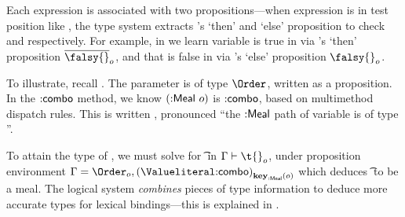 Each expression is associated with two propositions---when expression
 is in test position like
,
the type system extracts 's `then' and `else' proposition to check
 and  respectively.
For example, in 
we learn variable {} is true in  via {}'s `then' proposition $\notprop{\falsy{}}{\makelocal{o}}$, and 
that {} is false in  via {}'s `else' proposition $\isprop{\falsy{}}{\makelocal{o}}$.

To illustrate, recall .
The parameter  is of type $\Order$,
written
{}
as a proposition.
%
In the ${{\mathsf{\mathbin{:}combo}}}$ method, we know
${({\mathsf{\mathbin{:}Meal}}\ o)}$ is ${{\mathsf{\mathbin{:}combo}}}$,
based on multimethod dispatch rules. This is written
  {},
pronounced ``the ${{\mathsf{\mathbin{:}Meal}}}$ path of variable  is of type
{}''.

To attain the type of , 
we must solve for \t{} in
$
{ \inpropenv 
  {\propenv{}}
  {\isprop {\t{}} {\makelocal{o}}}}
$,
under proposition environment
$
\propenv{} = {{\isprop{\Order}{\makelocal{o}}},
    {\isprop{\Value{\makekw{combo}}}{\pth{\keype{\makekw{Meal}}}{\makelocal{o}}}}}
$
which deduces \t{} to be a {} meal.
The logical
system \emph{combines} pieces of type information to deduce more accurate types for lexical
bindings---this is explained in .

%





